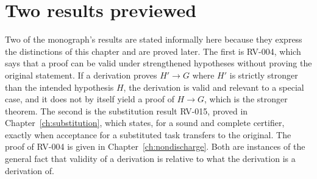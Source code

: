 \section{Two results previewed}

Two of the monograph's results are stated informally here because they express the distinctions of this chapter and are proved later. The first is RV-004, which says that a proof can be valid under strengthened hypotheses without proving the original statement. If a derivation proves $H' \to G$ where $H'$ is strictly stronger than the intended hypothesis $H$, the derivation is valid and relevant to a special case, and it does not by itself yield a proof of $H \to G$, which is the stronger theorem. The second is the substitution result RV-015, proved in Chapter~\ref{ch:substitution}, which states, for a sound and complete certifier, exactly when acceptance for a substituted task transfers to the original. The proof of RV-004 is given in Chapter~\ref{ch:nondischarge}. Both are instances of the general fact that validity of a derivation is relative to what the derivation is a derivation of.
